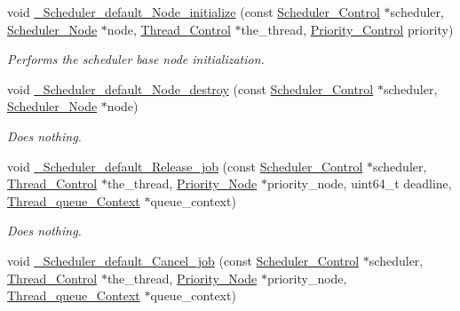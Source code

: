 \begin{DoxyCompactItemize}
void \mbox{\hyperlink{group__RTEMSScoreScheduler_ga5d20eaccfd13a48a2e9fc2bc283836e2}{\+\_\+\+Scheduler\+\_\+default\+\_\+\+Node\+\_\+initialize}} (const \mbox{\hyperlink{struct__Scheduler__Control}{Scheduler\+\_\+\+Control}} $\ast$scheduler, \mbox{\hyperlink{structScheduler__Node}{Scheduler\+\_\+\+Node}} $\ast$node, \mbox{\hyperlink{struct__Thread__Control}{Thread\+\_\+\+Control}} $\ast$the\+\_\+thread, \mbox{\hyperlink{group__RTEMSScorePriority_ga59d02b58072d31a9a1cfe644557aefe2}{Priority\+\_\+\+Control}} priority)
\begin{DoxyCompactList}\small\item\em Performs the scheduler base node initialization. \end{DoxyCompactList}\item 
void \mbox{\hyperlink{group__RTEMSScoreScheduler_ga51cd11696f0032cbd765cd9f13291079}{\+\_\+\+Scheduler\+\_\+default\+\_\+\+Node\+\_\+destroy}} (const \mbox{\hyperlink{struct__Scheduler__Control}{Scheduler\+\_\+\+Control}} $\ast$scheduler, \mbox{\hyperlink{structScheduler__Node}{Scheduler\+\_\+\+Node}} $\ast$node)
\begin{DoxyCompactList}\small\item\em Does nothing. \end{DoxyCompactList}\item 
void \mbox{\hyperlink{group__RTEMSScoreScheduler_ga42c11eba4b23d833f1d2ff3872f5069c}{\+\_\+\+Scheduler\+\_\+default\+\_\+\+Release\+\_\+job}} (const \mbox{\hyperlink{struct__Scheduler__Control}{Scheduler\+\_\+\+Control}} $\ast$scheduler, \mbox{\hyperlink{struct__Thread__Control}{Thread\+\_\+\+Control}} $\ast$the\+\_\+thread, \mbox{\hyperlink{structPriority__Node}{Priority\+\_\+\+Node}} $\ast$priority\+\_\+node, uint64\+\_\+t deadline, \mbox{\hyperlink{structThread__queue__Context}{Thread\+\_\+queue\+\_\+\+Context}} $\ast$queue\+\_\+context)
\begin{DoxyCompactList}\small\item\em Does nothing. \end{DoxyCompactList}\item 
void \mbox{\hyperlink{group__RTEMSScoreScheduler_gaf63cdd0f729ee283f28e46dd31f3e3b3}{\+\_\+\+Scheduler\+\_\+default\+\_\+\+Cancel\+\_\+job}} (const \mbox{\hyperlink{struct__Scheduler__Control}{Scheduler\+\_\+\+Control}} $\ast$scheduler, \mbox{\hyperlink{struct__Thread__Control}{Thread\+\_\+\+Control}} $\ast$the\+\_\+thread, \mbox{\hyperlink{structPriority__Node}{Priority\+\_\+\+Node}} $\ast$priority\+\_\+node, \mbox{\hyperlink{structThread__queue__Context}{Thread\+\_\+queue\+\_\+\+Context}} $\ast$queue\+\_\+context)

\end{DoxyCompactItemize}
